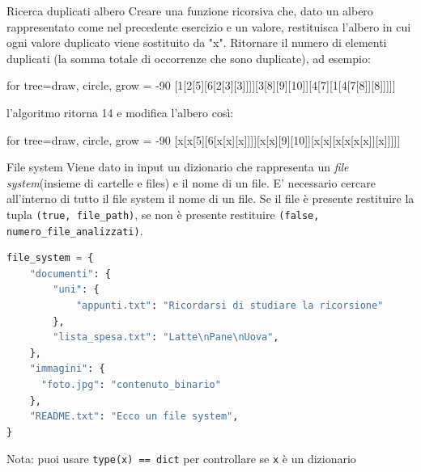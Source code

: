 \begin{esercizio}{Ricerca duplicati albero}
	Creare una funzione ricorsiva che, dato un albero rappresentato come nel precedente esercizio e un valore, restituisca l'albero in cui ogni valore duplicato viene sostituito da "x". Ritornare il numero di elementi duplicati (la somma totale di occorrenze che sono duplicate), ad esempio:
	\begin{center}
		\begin{forest}
			for tree={draw, circle, grow = -90}
			[1[2[5][6[2[3][3]]]][3[8][9][10]][4[7][1[4[7[8]][8]]]]]
		\end{forest}
	\end{center}
	l'algoritmo ritorna 14 e modifica l'albero così:
	\begin{center}
		\begin{forest}
			for tree={draw, circle, grow = -90}
			[x[x[5][6[x[x][x]]]][x[x][9][10]][x[x][x[x[x[x]][x]]]]]
		\end{forest}
	\end{center}
\end{esercizio}

\begin{esercizio}{File system}
	Viene dato in input un dizionario che rappresenta un \textit{file system}(insieme di cartelle e files) e il nome di un file. E' necessario cercare all'interno di tutto il file system il nome di un file. Se il file è presente restituire la tupla \verb|(true, file_path)|, se non è presente restituire \verb|(false, numero_file_analizzati)|.
	\begin{lstlisting}[language = python, frame = none]
file_system = {
    "documenti": {
        "uni": {
            "appunti.txt": "Ricordarsi di studiare la ricorsione"
        },
        "lista_spesa.txt": "Latte\nPane\nUova",
    },
    "immagini": {
      "foto.jpg": "contenuto_binario"
    },
    "README.txt": "Ecco un file system",
}
  \end{lstlisting}
	Nota: puoi usare \verb|type(x) == dict| per controllare se \verb|x| è un dizionario
\end{esercizio}

